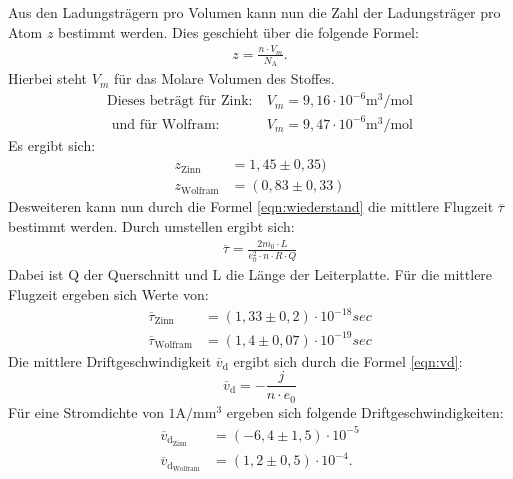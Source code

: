 Aus den Ladungsträgern pro Volumen kann nun die Zahl der Ladungsträger pro Atom $z$
bestimmt werden. Dies geschieht über die folgende Formel:
\begin{align}
  z=\frac{n \cdot V_m}{N_\mathrm{A}}.
\end{align}
Hierbei steht $V_m$ für das Molare Volumen des Stoffes.
\begin{align*}
\text{Dieses beträgt für Zink:}& \ V_m=9,16\cdot10^{-6}\si{\meter\tothe{3}\per\mol}\\
\text{ und für Wolfram}:& \ V_m=9,47\cdot10^{-6}\si{\meter\tothe{3}\per\mol}
\end{align*}
Es ergibt sich:
\begin{align}
z_\mathrm{Zinn}&=1,45\pm0,35)\\ %
z_\mathrm{Wolfram}&=(0,83\pm0,33)
\end{align}
Desweiteren kann nun durch die Formel \eqref{eqn:wiederstand} die mittlere
Flugzeit $\overline\tau$ bestimmt werden. Durch umstellen ergibt sich:
\begin{align}
  \overline{\tau}=\frac{2m_0\cdot L}{e_0^2 \cdot n \cdot R \cdot Q}
\end{align}
Dabei ist Q der Querschnitt und L die Länge der Leiterplatte.
Für die mittlere Flugzeit ergeben sich Werte von:
\begin{align*}
\overline{\tau}_\mathrm{Zinn}&=(1,33\pm0,2)\cdot10^{-18}\si{sec}\\
\overline{\tau}_\mathrm{Wolfram}&=(1,4\pm0,07)\cdot10^{-19}\si{sec}
\end{align*}
Die mittlere Driftgeschwindigkeit $\overline{v}_\mathrm{d}$ ergibt sich durch die Formel \eqref{eqn:vd}:
\begin{equation}
  \overline{v}_\mathrm{d}=-\frac{j}{n \cdot e_0}\label{eqn:vd}
\end{equation}
Für eine Stromdichte von $1\si{\ampere\per\milli\meter\tothe{3}}$ ergeben sich folgende Driftgeschwindigkeiten:
\begin{align}
\overline{v}_\mathrm{d}_\mathrm{Zinn}&=(-6,4\pm1,5)\cdot10^{-5}\si{}\\
\overline{v}_\mathrm{d}_\mathrm{Wolfram}&=(1,2\pm0,5)\cdot10^{-4}\si{}.
\end{align}

